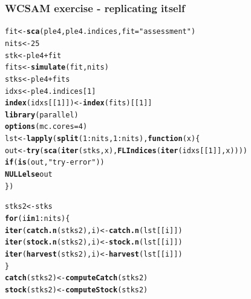 \documentclass[a4paper,english,10pt]{article}\usepackage[]{graphicx}\usepackage[]{color}
\makeatletter
\newcommand{\hlnum}[1]{\textcolor[rgb]{0.686,0.059,0.569}{#1}}%
\newcommand{\hlstr}[1]{\textcolor[rgb]{0.192,0.494,0.8}{#1}}%
\newcommand{\hlopt}[1]{\textcolor[rgb]{0,0,0}{#1}}%
\newcommand{\hlstd}[1]{\textcolor[rgb]{0.345,0.345,0.345}{#1}}%
\newcommand{\hlkwa}[1]{\textcolor[rgb]{0.161,0.373,0.58}{\textbf{#1}}}%
\newcommand{\hlkwb}[1]{\textcolor[rgb]{0.69,0.353,0.396}{#1}}%
\newcommand{\hlkwc}[1]{\textcolor[rgb]{0.333,0.667,0.333}{#1}}%
\newcommand{\hlkwd}[1]{\textcolor[rgb]{0.737,0.353,0.396}{\textbf{#1}}}%
\newenvironment{kframe}{%
 \def\at@end@of@kframe{}%
 \ifinner\ifhmode%
  \def\at@end@of@kframe{\end{minipage}}%
  \begin{minipage}{\columnwidth}%
 \fi\fi%
 \def\FrameCommand##1{\hskip\@totalleftmargin \hskip-\fboxsep
 \colorbox{shadecolor}{##1}\hskip-\fboxsep
     \hskip-\linewidth \hskip-\@totalleftmargin \hskip\columnwidth}%
 \MakeFramed {\advance\hsize-\width
   \@totalleftmargin\z@ \linewidth\hsize
   \@setminipage}}%
 {\par\unskip\endMakeFramed%
 \at@end@of@kframe}
\newenvironment{knitrout}{}{} %
\makeatother
\begin{document}


\subsubsection{WCSAM exercise - replicating itself}

\begin{knitrout}
\color{fgcolor}\begin{kframe}
\begin{alltt}
\hlstd{fit} \hlkwb{<-} \hlkwd{sca}\hlstd{(ple4, ple4.indices,} \hlkwc{fit} \hlstd{=} \hlstr{"assessment"}\hlstd{)}
\hlstd{nits} \hlkwb{<-} \hlnum{25}
\hlstd{stk} \hlkwb{<-} \hlstd{ple4} \hlopt{+} \hlstd{fit}
\hlstd{fits} \hlkwb{<-} \hlkwd{simulate}\hlstd{(fit, nits)}
\hlstd{stks} \hlkwb{<-} \hlstd{ple4} \hlopt{+} \hlstd{fits}
\hlstd{idxs} \hlkwb{<-} \hlstd{ple4.indices[}\hlnum{1}\hlstd{]}
\hlkwd{index}\hlstd{(idxs[[}\hlnum{1}\hlstd{]])} \hlkwb{<-} \hlkwd{index}\hlstd{(fits)[[}\hlnum{1}\hlstd{]]}
\hlkwd{library}\hlstd{(parallel)}
\hlkwd{options}\hlstd{(}\hlkwc{mc.cores} \hlstd{=} \hlnum{4}\hlstd{)}
\hlstd{lst} \hlkwb{<-} \hlkwd{lapply}\hlstd{(}\hlkwd{split}\hlstd{(}\hlnum{1}\hlopt{:}\hlstd{nits,} \hlnum{1}\hlopt{:}\hlstd{nits),} \hlkwa{function}\hlstd{(}\hlkwc{x}\hlstd{) \{}
    \hlstd{out} \hlkwb{<-} \hlkwd{try}\hlstd{(}\hlkwd{sca}\hlstd{(}\hlkwd{iter}\hlstd{(stks, x),} \hlkwd{FLIndices}\hlstd{(}\hlkwd{iter}\hlstd{(idxs[[}\hlnum{1}\hlstd{]], x))))}
    \hlkwa{if} \hlstd{(}\hlkwd{is}\hlstd{(out,} \hlstr{"try-error"}\hlstd{))}
        \hlkwa{NULL else} \hlstd{out}
\hlstd{\})}

\hlstd{stks2} \hlkwb{<-} \hlstd{stks}
\hlkwa{for} \hlstd{(i} \hlkwa{in} \hlnum{1}\hlopt{:}\hlstd{nits) \{}
    \hlkwd{iter}\hlstd{(}\hlkwd{catch.n}\hlstd{(stks2), i)} \hlkwb{<-} \hlkwd{catch.n}\hlstd{(lst[[i]])}
    \hlkwd{iter}\hlstd{(}\hlkwd{stock.n}\hlstd{(stks2), i)} \hlkwb{<-} \hlkwd{stock.n}\hlstd{(lst[[i]])}
    \hlkwd{iter}\hlstd{(}\hlkwd{harvest}\hlstd{(stks2), i)} \hlkwb{<-} \hlkwd{harvest}\hlstd{(lst[[i]])}
\hlstd{\}}
\hlkwd{catch}\hlstd{(stks2)} \hlkwb{<-} \hlkwd{computeCatch}\hlstd{(stks2)}
\hlkwd{stock}\hlstd{(stks2)} \hlkwb{<-} \hlkwd{computeStock}\hlstd{(stks2)}
\end{alltt}
\end{kframe}
\end{knitrout}
\end{document}
